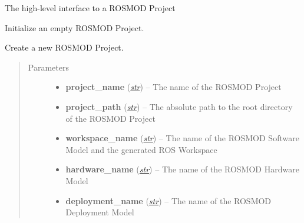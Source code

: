 \documentclass[letterpaper,10pt,english]{sphinxmanual}
\begin{document}
\begin{fulllineitems}
\label{class_Project:ROSMOD_Project}
The high-level interface to a ROSMOD Project

\begin{fulllineitems}
\label{class_Project:ROSMOD_Project.__init__}
Initialize an empty ROSMOD Project.

\end{fulllineitems}


\begin{fulllineitems}
\label{class_Project:ROSMOD_Project.new}
Create a new ROSMOD Project.
\begin{quote}\begin{description}
\item[{Parameters}] \leavevmode\begin{itemize}
\item {} 
\textbf{project\_name} (\href{http://docs.python.org/library/functions.html\#str}{\emph{str}}) -- The name of the ROSMOD Project

\item {} 
\textbf{project\_path} (\href{http://docs.python.org/library/functions.html\#str}{\emph{str}}) -- The absolute path to the root directory of the ROSMOD Project

\item {} 
\textbf{workspace\_name} (\href{http://docs.python.org/library/functions.html\#str}{\emph{str}}) -- The name of the ROSMOD Software Model and the generated ROS Workspace

\item {} 
\textbf{hardware\_name} (\href{http://docs.python.org/library/functions.html\#str}{\emph{str}}) -- The name of the ROSMOD Hardware Model

\item {} 
\textbf{deployment\_name} (\href{http://docs.python.org/library/functions.html\#str}{\emph{str}}) -- The name of the ROSMOD Deployment Model

\end{itemize}


\end{description}
\end{quote}
\end{fulllineitems}
\end{fulllineitems}
\end{document}
